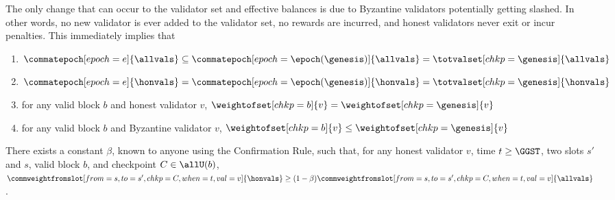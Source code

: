 \documentclass{article}
\begin{document}
\begin{assumption}\label{assum:no-change-to-the-validator-set}
    The only change that can occur to the validator set and effective balances is due to Byzantine validators potentially getting slashed.
    In other words, no new validator is ever added to the validator set, no rewards are incurred, and honest validators never exit or incur penalties.
    This immediately implies that
    \begin{enumerate}
        \item $\commatepoch[epoch=e]{\allvals}\subseteq\commatepoch[epoch=\epoch(\genesis)]{\allvals}=\totvalset[chkp=\genesis]{\allvals}$
        \item $\commatepoch[epoch=e]{\honvals} = \commatepoch[epoch=\epoch(\genesis)]{\honvals} = \totvalset[chkp=\genesis]{\honvals}$
        \item for any valid block $b$ and honest validator $v$, $\weightofset[chkp=b]{v}=\weightofset[chkp=\genesis]{v}$
        \item for any valid block $b$ and Byzantine validator $v$, $\weightofset[chkp=b]{v}\leq\weightofset[chkp=\genesis]{v}$
    \end{enumerate}
\end{assumption}

\begin{assumption}\label{assum:beta}
    There exists a constant $\beta$, known to anyone using the Confirmation Rule,
    such that,
    for any
    honest validator $v$,
    time $t\geq \GGST$,
    two slots $s'$ and $s$,
    valid block $b$, 
    and checkpoint $C \in \allU(b)$,
    $\commweightfromslot[from=s,to=s',chkp=C,when=t,val=v]{\honvals} \geq (1-\beta) \commweightfromslot[from=s,to=s',chkp=C,when=t,val=v]{\allvals}$.
\end{assumption}

\end{document}
